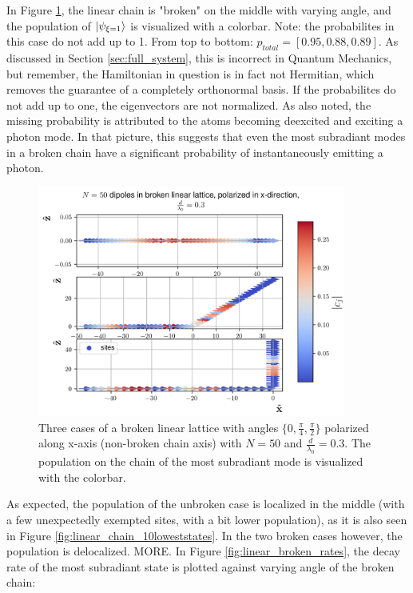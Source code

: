 \documentclass{article}
\begin{document}
In Figure \ref{fig:linear_broken}, the linear chain is "broken" on the middle with varying angle, and the population of $\ket{\psi_{\xi=1}}$ is visualized with a colorbar. Note: the probabilites in this case do not add up to 1. From top to bottom: $p_{total} = [0.95, 0.88, 0.89]$. As discussed in Section \ref{sec:full_system}, this is incorrect in Quantum Mechanics, but remember, the Hamiltonian in question is in fact not Hermitian, which removes the guarantee of a completely orthonormal basis. If the probabilites do not add up to one, the eigenvectors are not normalized. As also noted, the missing probability is attributed to the atoms becoming deexcited and exciting a photon mode. In that picture, this suggests that even the most subradiant modes in a broken chain have a significant probability of instantaneously emitting a photon. 
\begin{figure}[H]
    \includegraphics[width=0.9\textwidth]{figs/dipoles_case_linear_broken.png}
    \caption{Three cases of a broken linear lattice with angles $\{0, \frac{\pi}{4}, \frac{\pi}{2}\}$ polarized along x-axis (non-broken chain axis) with $N = 50$ and $\frac{d}{\lambda_0} = 0.3$. The population on the chain of the most subradiant mode is visualized with the colorbar.}
    \label{fig:linear_broken}
\end{figure}
As expected, the population of the unbroken case is localized in the middle (with a few unexpectedly exempted sites, with a bit lower population), as it is also seen in Figure \ref{fig:linear_chain_10loweststates}. In the two broken cases however, the population is delocalized. MORE. In Figure \ref{fig:linear_broken_rates}, the decay rate of the most subradiant state is plotted against varying angle of the broken chain:
\end{document}

